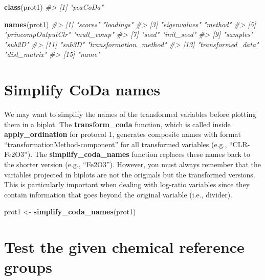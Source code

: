 \documentclass[12pt,]{book}
\newenvironment{Shaded}{\begin{snugshade}}{\end{snugshade}}
\newcommand{\CommentTok}[1]{\textcolor[rgb]{0.56,0.35,0.01}{\textit{#1}}}
\newcommand{\KeywordTok}[1]{\textcolor[rgb]{0.13,0.29,0.53}{\textbf{#1}}}
\newcommand{\NormalTok}[1]{#1}
\newcommand{\StringTok}[1]{\textcolor[rgb]{0.31,0.60,0.02}{#1}}
\begin{document}
\begin{Shaded}
\begin{Highlighting}[]
\KeywordTok{class}\NormalTok{(prot1)}
\CommentTok{#> [1] "pcaCoDa"}

\KeywordTok{names}\NormalTok{(prot1)}
\CommentTok{#>  [1] "scores"                "loadings"             }
\CommentTok{#>  [3] "eigenvalues"           "method"               }
\CommentTok{#>  [5] "princompOutputClr"     "mult_comp"            }
\CommentTok{#>  [7] "seed"                  "init_seed"            }
\CommentTok{#>  [9] "samples"               "sub2D"                }
\CommentTok{#> [11] "sub3D"                 "transformation_method"}
\CommentTok{#> [13] "transformed_data"      "dist_matrix"          }
\CommentTok{#> [15] "name"}
\end{Highlighting}
\end{Shaded}

\hypertarget{simplify-coda-names}{%
\section{Simplify CoDa names}\label{simplify-coda-names}}

We may want to simplify the names of the transformed variables before plotting them in a biplot. The \textbf{transform\_coda} function, which is called inside \textbf{apply\_ordination} for protocol 1, generates composite names with format ``transformationMethod-component'' for all transformed variables (e.g., ``CLR-Fe2O3''). The \textbf{simplify\_coda\_names} function replaces these names back to the shorter version (e.g., ``Fe2O3''). However, you must always remember that the variables projected in biplots are not the originals but the transformed versions. This is particularly important when dealing with log-ratio variables since they contain information that goes beyond the original variable (i.e., divider).

\begin{Shaded}
\begin{Highlighting}[]
\NormalTok{prot1 <-}\StringTok{ }\KeywordTok{simplify_coda_names}\NormalTok{(prot1)}
\end{Highlighting}
\end{Shaded}

\hypertarget{test-the-given-chemical-reference-groups}{%
\section{Test the given chemical reference groups}\label{test-the-given-chemical-reference-groups}}
\end{document}
